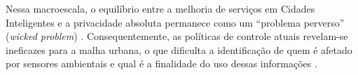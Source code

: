 \documentclass[
	12pt,				%
	oneside,			%
	a4paper,			%
	english,			%
	brazil				%
	]{abntex2ppgsi}
\begin{document}
    Nessa macroescala, o equilíbrio entre a melhoria de serviços em Cidades Inteligentes e a privacidade absoluta permanece como um ``problema perverso'' (\textit{wicked problem}) \cite{Meireles2016, Chowdhury2016}. Consequentemente, as políticas de controle atuais revelam-se ineficazes para a malha urbana, o que dificulta a identificação de quem é afetado por sensores ambientais e qual é a finalidade do uso dessas informações \cite{Mashhadi2014}.
\end{document}
